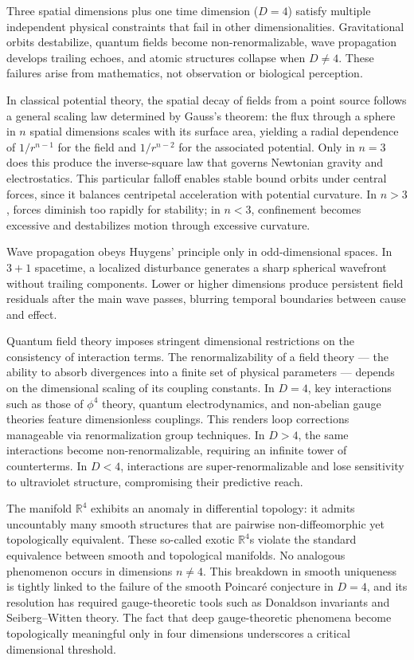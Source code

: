 
Three spatial dimensions plus one time dimension ($D=4$) satisfy multiple independent physical constraints that fail in other dimensionalities. Gravitational orbits destabilize, quantum fields become non-renormalizable, wave propagation develops trailing echoes, and atomic structures collapse when $D \ne 4$. These failures arise from mathematics, not observation or biological perception.

In classical potential theory, the spatial decay of fields from a point source follows a general scaling law determined by Gauss’s theorem: the flux through a sphere in $n$ spatial dimensions scales with its surface area, yielding a radial dependence of $1/r^{n-1}$ for the field and $1/r^{n-2}$ for the associated potential. Only in $n=3$ does this produce the inverse-square law that governs Newtonian gravity and electrostatics. This particular falloff enables stable bound orbits under central forces, since it balances centripetal acceleration with potential curvature. In $n>3$, forces diminish too rapidly for stability; in $n<3$, confinement becomes excessive and destabilizes motion through excessive curvature.

Wave propagation obeys Huygens' principle only in odd-dimensional spaces. In $3+1$ spacetime, a localized disturbance generates a sharp spherical wavefront without trailing components. Lower or higher dimensions produce persistent field residuals after the main wave passes, blurring temporal boundaries between cause and effect.

Quantum field theory imposes stringent dimensional restrictions on the consistency of interaction terms. The renormalizability of a field theory — the ability to absorb divergences into a finite set of physical parameters — depends on the dimensional scaling of its coupling constants. In $D=4$, key interactions such as those of $\phi^4$ theory, quantum electrodynamics, and non-abelian gauge theories feature dimensionless couplings. This renders loop corrections manageable via renormalization group techniques. In $D>4$, the same interactions become non-renormalizable, requiring an infinite tower of counterterms. In $D<4$, interactions are super-renormalizable and lose sensitivity to ultraviolet structure, compromising their predictive reach.

The manifold $\mathbb{R}^4$ exhibits an anomaly in differential topology: it admits uncountably many smooth structures that are pairwise non-diffeomorphic yet topologically equivalent. These so-called exotic $\mathbb{R}^4$s violate the standard equivalence between smooth and topological manifolds. No analogous phenomenon occurs in dimensions $n \ne 4$. This breakdown in smooth uniqueness is tightly linked to the failure of the smooth Poincaré conjecture in $D=4$, and its resolution has required gauge-theoretic tools such as Donaldson invariants and Seiberg–Witten theory. The fact that deep gauge-theoretic phenomena become topologically meaningful only in four dimensions underscores a critical dimensional threshold.


